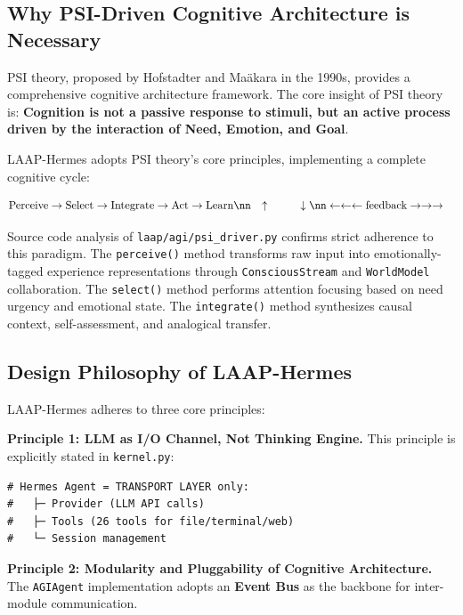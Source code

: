 \documentclass[10pt,twocolumn,letterpaper]{article}
\begin{document}
\subsection{Why PSI-Driven Cognitive Architecture is Necessary}
\label{ssec:why_psi}

PSI theory, proposed by Hofstadter and Ma\"akara in the 1990s, provides a comprehensive cognitive architecture framework. The core insight of PSI theory is: \textbf{Cognition is not a passive response to stimuli, but an active process driven by the interaction of Need, Emotion, and Goal}.

LAAP-Hermes adopts PSI theory's core principles, implementing a complete cognitive cycle:

\begin{align}
    \text{Perceive} &\rightarrow \text{Select} \rightarrow \text{Integrate} \rightarrow \text{Act} \rightarrow \text{Learn} \nn
    & \uparrow \hspace{3em} \downarrow \nn
    & \leftarrow \leftarrow \leftarrow \text{feedback} \rightarrow \rightarrow \rightarrow
    \label{eq:psi_cycle}
\end{align}

Source code analysis of \texttt{laap/agi/psi\_driver.py} confirms strict adherence to this paradigm. The \texttt{perceive()} method transforms raw input into emotionally-tagged experience representations through \texttt{ConsciousStream} and \texttt{WorldModel} collaboration. The \texttt{select()} method performs attention focusing based on need urgency and emotional state. The \texttt{integrate()} method synthesizes causal context, self-assessment, and analogical transfer.

\subsection{Design Philosophy of LAAP-Hermes}
\label{ssec:design_philosophy}

LAAP-Hermes adheres to three core principles:

\textbf{Principle 1: LLM as I/O Channel, Not Thinking Engine.} This principle is explicitly stated in \texttt{kernel.py}:

\begin{verbatim}
# Hermes Agent = TRANSPORT LAYER only:
#   ├─ Provider (LLM API calls)
#   ├─ Tools (26 tools for file/terminal/web)
#   └─ Session management
\end{verbatim}

\textbf{Principle 2: Modularity and Pluggability of Cognitive Architecture.} The \texttt{AGIAgent} implementation adopts an \textbf{Event Bus} as the backbone for inter-module communication.
\end{document}
